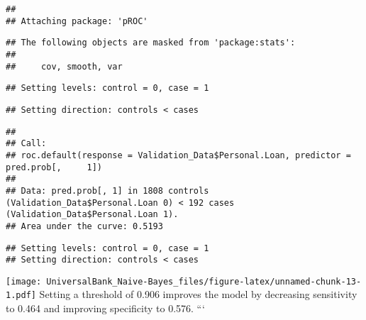 \documentclass[
]{article}
\newenvironment{Shaded}{\begin{snugshade}}{\end{snugshade}}
\newcommand{\AttributeTok}[1]{\textcolor[rgb]{0.77,0.63,0.00}{#1}}
\newcommand{\DecValTok}[1]{\textcolor[rgb]{0.00,0.00,0.81}{#1}}
\newcommand{\FunctionTok}[1]{\textcolor[rgb]{0.00,0.00,0.00}{#1}}
\newcommand{\NormalTok}[1]{#1}
\newcommand{\SpecialCharTok}[1]{\textcolor[rgb]{0.00,0.00,0.00}{#1}}
\newcommand{\StringTok}[1]{\textcolor[rgb]{0.31,0.60,0.02}{#1}}
\begin{document}
\begin{verbatim}
## 
## Attaching package: 'pROC'
\end{verbatim}

\begin{verbatim}
## The following objects are masked from 'package:stats':
## 
##     cov, smooth, var
\end{verbatim}

\begin{Shaded}
\end{Shaded}

\begin{verbatim}
## Setting levels: control = 0, case = 1
\end{verbatim}

\begin{verbatim}
## Setting direction: controls < cases
\end{verbatim}

\begin{verbatim}
## 
## Call:
## roc.default(response = Validation_Data$Personal.Loan, predictor = pred.prob[,     1])
## 
## Data: pred.prob[, 1] in 1808 controls (Validation_Data$Personal.Loan 0) < 192 cases (Validation_Data$Personal.Loan 1).
## Area under the curve: 0.5193
\end{verbatim}

\begin{Shaded}
\end{Shaded}

\begin{verbatim}
## Setting levels: control = 0, case = 1
## Setting direction: controls < cases
\end{verbatim}

\texttt{[image: UniversalBank\_Naive-Bayes\_files/figure-latex/unnamed-chunk-13-1.pdf]}
Setting a threshold of 0.906 improves the model by decreasing
sensitivity to 0.464 and improving specificity to 0.576. ```
\end{document}
